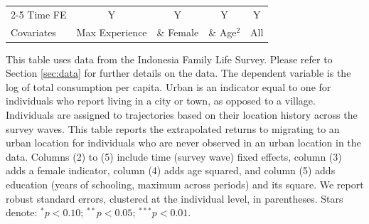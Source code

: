 \begin{table}[htbp]
\begin{threeparttable}
\begin{tabular}{l cccc}
\cmidrule{2-5} Time FE & Y & Y & Y & Y \\ Covariates & Max Experience & \& Female & \& Age$^2$ & All \\ \bottomrule \end{tabular} \begin{tablenotes}[flushleft] \footnotesize \item{This table uses data from the Indonesia Family Life Survey. Please refer to Section \ref{sec:data} for further details on the data. The dependent variable is the log of total consumption per capita. Urban is an indicator equal to one for individuals who report living in a city or town, as opposed to a village. Individuals are assigned to trajectories based on their location history across the survey waves. This table reports the extrapolated returns to migrating to an urban location for individuals who are never observed in an urban location in the data. Columns (2) to (5) include time (survey wave) fixed effects, column (3) adds a female indicator, column (4) adds age squared, and column (5) adds education (years of schooling, maximum across periods) and its square. We report robust standard errors, clustered at the individual level, in parentheses. Stars denote: $^{*} p<0.10$; $^{**} p<0.05$; $^{***} p<0.01$.} \end{tablenotes} \end{threeparttable} \end{table}
